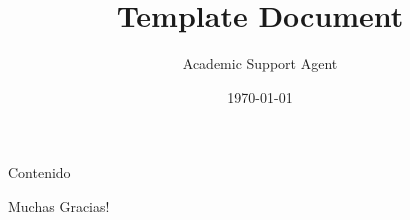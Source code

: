 \documentclass{article}
\title{Template Document}
\author{Academic Support Agent}
\date{\today}
\begin{document}
\maketitle

{
        \begin{frame}[plain]
            \titlepage
        \end{frame}
    }
    
\begin{frame}{Contenido}
    
\end{frame}












\begin{frame}
\Huge{\centerline{ Muchas Gracias!}}
\end{frame}
\end{document}
